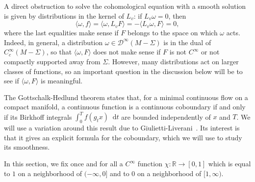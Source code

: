 \documentclass[JEP,XML,SOM,Unicode]{cedram}
\newcommand{\boD}{\mathcal{D}}
\newcommand{\R}{\mathbb{R}}
\newcommand{\dd}{\mathop{}\!\mathrm{d}}
\theoremstyle{definition}
\numberwithin{equation}{section}
\begin{document}
A direct obstruction to solve the cohomological equation with a smooth
solution is given by distributions in the kernel of $L_v$: if $L_v \omega =
0$, then
\begin{equation*}
\langle \omega, f \rangle = \langle \omega, L_v F \rangle
=- \langle L_v \omega, F \rangle = 0,
\end{equation*}
where the last equalities make sense if $F$ belongs to the space on which
$\omega$ acts. Indeed, in general, a distribution $\omega \in
\boD^\infty(M-\Sigma)$ is in the dual of $C^\infty_c(M-\Sigma)$, so that
$\langle \omega, F\rangle$ does not make sense if $F$ is not $C^\infty$ or
not compactly supported away from $\Sigma$. However, many distributions act
on larger classes of functions, so an important question in the discussion
below will be to see if $\langle \omega, F\rangle$ is meaningful.

The Gottschalk-Hedlund theorem states that, for a minimal continuous flow on
a compact manifold, a continuous function is a continuous coboundary if and
only if its Birkhoff integrals $\int_0^T f(g_t x) \dd t$ are bounded
independently of $x$ and $T$. We will use a variation around this result due
to Giulietti-Liverani~\cite{giulietti_liverani}. Its interest is that it
gives an explicit formula for the coboundary, which we will use to study its
smoothness.

In this section, we fix once and for all a $C^\infty$ function $\chi:\R \to
[0,1]$ which is equal to $1$ on a neighborhood of $(-\infty, 0]$ and to $0$
on a neighborhood of $[1,\infty)$.
\end{document}
